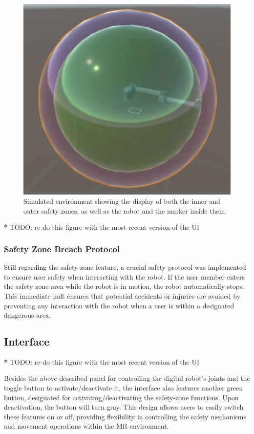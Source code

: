 \begin{figure}[h]
\centering
\includegraphics[width=0.5\linewidth]{figs/dual-safetyzone-robot.png}
\caption{Simulated environment showing the display of both the inner and outer safety zones, as well as the robot and the marker inside them}
\label{fig:dual-safety}
\end{figure}
* TODO: re-do this figure with the most recent version of the UI

\subsubsection{Safety Zone Breach Protocol}

Still regarding the safety-zone feature, a crucial safety protocol was implemented to ensure user safety when interacting with the robot. If the user member enters the safety zone area while the robot is in motion, the robot automatically stops. This immediate halt ensures that potential accidents or injuries are avoided by preventing any interaction with the robot when a user is within a designated dangerous area.
    
\subsection{Interface}

* TODO: re-do this figure with the most recent version of the UI

Besides the above described panel for controlling the digital robot's joints and the toggle button to activate/deactivate it, the interface also features another green button, designated for activating/deactivating the safety-zone functions. Upon deactivation, the button will turn gray. This design allows users to easily switch these features on or off, providing flexibility in controlling the safety mechanisms and movement operations within the \ac{MR} environment.

